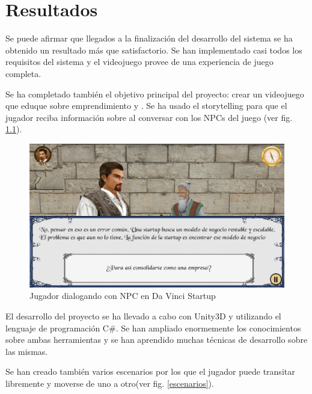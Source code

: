 \chapter{Resultados}

Se  puede afirmar que llegados a la finalización del desarrollo del sistema se ha obtenido un resultado más que satisfactorio. Se han implementado casi todos los requisitos del sistema y el videojuego provee de una experiencia de juego completa.

Se ha completado también el objetivo principal del proyecto: crear un videojuego que eduque sobre emprendimiento y . Se ha usado el storytelling para que el jugador reciba información sobre  al conversar con los NPCs del juego (ver fig. \ref{dialogo}).

\begin{figure}[H]
\begin{center}
\includegraphics[scale=0.5]{imagenes/dialogo.png}
\caption{Jugador dialogando con NPC en Da Vinci Startup}
\label{dialogo}
\end{center}
\end{figure}

El desarrollo del proyecto se ha llevado a cabo con Unity3D y utilizando el lenguaje de programación C\#. Se han ampliado enormemente los conocimientos sobre ambas herramientas y se han aprendido muchas técnicas de desarrollo sobre las mismas.

Se han creado también varios  escenarios por los que el jugador puede transitar libremente y moverse de uno a otro(ver fig. \ref{escenarios}).

